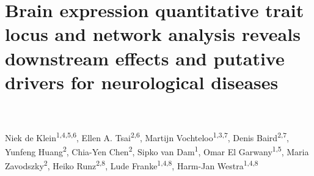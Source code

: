 \chapterfont{\color{DarkOrange}}  %
\sectionfont{\color{DarkOrange}}  %
\subsectionfont{\color{DarkOrange}}  %

\renewcommand\pcolor{DarkOrange}
\renewcommand{\headrule}{\hbox to\headwidth{%
		\color{DarkOrange}\leaders\hrule height \headrulewidth\hfill}} %
\fancyfoot[LE,RO]{\thepage}

{ \Large {} }

\chapter[Brain expression quantitative trait locus and network analysis reveals downstream effects and putative drivers for neurological diseases ]{Brain expression quantitative trait locus and network analysis reveals downstream effects and putative drivers for neurological diseases}
\chaptermark{}

\label{chap:chapter5-brain}

\noindent
\\
\\

Niek de Klein\textsuperscript{1,4,5,6}, Ellen A. Tsai\textsuperscript{2,6}, Martijn Vochteloo\textsuperscript{1,3,7}, Denis Baird\textsuperscript{2,7}, Yunfeng Huang\textsuperscript{2}, Chia-Yen Chen\textsuperscript{2}, Sipko van Dam\textsuperscript{1}, Omar El Garwany\textsuperscript{1,5}, Maria Zavodszky\textsuperscript{2}, Heiko Runz\textsuperscript{2,8}, Lude Franke\textsuperscript{1,4,8}, Harm-Jan Westra\textsuperscript{1,4,8}







